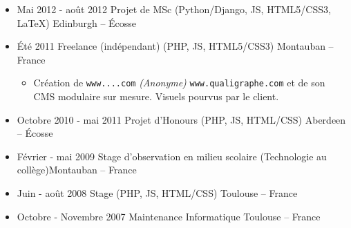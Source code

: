 \documentclass{res}
\begin{document}
\begin{resume}
\begin{itemize}
		\begin{itemize}
			\item[] \'Equipe de R\'eplication des Donn\'ees, d\'epartement Middleware d'\textbf{Amadeus}. Ax\'e R\&D, j'ai travaill\'e sur :
			\begin{itemize}
				\item[+] l'am\'elioration de performances g\'en\'erales (r\'eseau, bases de donn\'ees, algorithmie).
				\item[+] la r\'eplication de donn\'ees \`a travers des milliers de n\oe{}uds. Donn\'ees statiques, ou extr\^emement dynamiques.
				\item[+] la conception et l'impl\'ementation de types abstraits cohérents pour relier Oracle $\rightleftarrows$ C++ $\rightleftarrows$ Sqlite $\rightleftarrows$ Python.
				\item[+] divers scripts pour prototyper, acc\'el\'erer ou automatiser des t\^aches : stockage~/ r\'ecup\'eration~/ backup\textellipsis
				\item[+] l'export de donn\'ees depuis nos caches vers deux it\'erations successives de XMLs, en g\'en\'erant des XSLTs et des XSDs \`a partir de meta-XSLTs. Cela nous a permis de publier du XML avec diff\'erentes versions de schemas.
				\item[+] la conception et l'impl\'ementation d'un algorithme de Hepburn modifi\'e pour la translitt\'eration du japonais.
				\item[+] la d\'ecommission de commandes de terminaux depuis TPF (IBM) vers une nouvelle architecture en C++.
			\end{itemize}
		\end{itemize}
		\item[] Mai 2012 - ao\^ut 2012 \tabto{5cm} Projet de MSc (Python/Django, JS, HTML5/CSS3, \LaTeX{}) \hfill Edinburgh -- \'Ecosse
		\item[] \'Et\'e 2011 \tabto{5cm} Freelance (ind\'ependant) (PHP, JS, HTML5/CSS3) \hfill Montauban -- France
		\begin{itemize}
			\item[] Cr\'eation de \ifisanon \texttt{www....com} \textit{(Anonyme)} \else \texttt{www.qualigraphe.com} \fi et de son CMS modulaire sur mesure. Visuels pourvus par le client.
		\end{itemize}
		\item[] Octobre 2010 - mai 2011 \tabto{5cm} Projet d'Honours (PHP, JS, HTML/CSS) \hfill Aberdeen -- \'Ecosse
		\item[] F\'evrier - mai 2009 \tabto{5cm} Stage d'observation en milieu scolaire (Technologie au coll\`ege)\hfill Montauban -- France
		\item[] Juin - ao\^ut 2008 \tabto{5cm} Stage (PHP, JS, HTML/CSS) \hfill Toulouse -- France
		\item[] Octobre - Novembre 2007 \tabto{5cm} Maintenance Informatique \hfill Toulouse -- France
	\end{itemize}


\end{resume}
\end{document}

